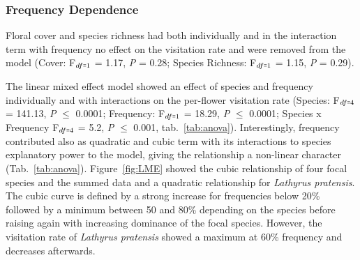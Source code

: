 \subsubsection*{Frequency Dependence}			
Floral cover and species richness had both individually and in the interaction term with frequency no effect on the visitation rate and were removed from the model (Cover: F$_{df\shorteq1}$ = 1.17, \textit{P} = 0.28; Species Richness: F$ _{df\shorteq1} $ = 1.15, \textit{P} = 0.29). 

The linear mixed effect model showed an effect of species and frequency individually and with interactions on the per-flower visitation rate (Species: F$_{df\shorteq4}$ = 141.13, \textit{P} $\leq$ 0.0001; Frequency: F$_{df\shorteq1}$ = 18.29, \textit{P} $\leq$ 0.0001; Species x Frequency F$_{ df\shorteq4}$ = 5.2, \textit{P} $\leq$ 0.001, tab.~\ref{tab:anova}). Interestingly, frequency contributed also as quadratic and cubic term with its interactions to species explanatory power to the model, giving the relationship a non-linear character (Tab.~\ref{tab:anova}). Figure~\ref{fig:LME} showed the cubic relationship of four focal species and the summed data and a quadratic relationship for \textit{Lathyrus pratensis}. The cubic curve is defined by a strong increase for frequencies below 20\% followed by a minimum between 50 and 80\% depending on the species before raising again with increasing dominance of the focal species. However, the visitation rate of \textit{Lathyrus pratensis} showed a maximum at 60\% frequency and decreases afterwards. 

